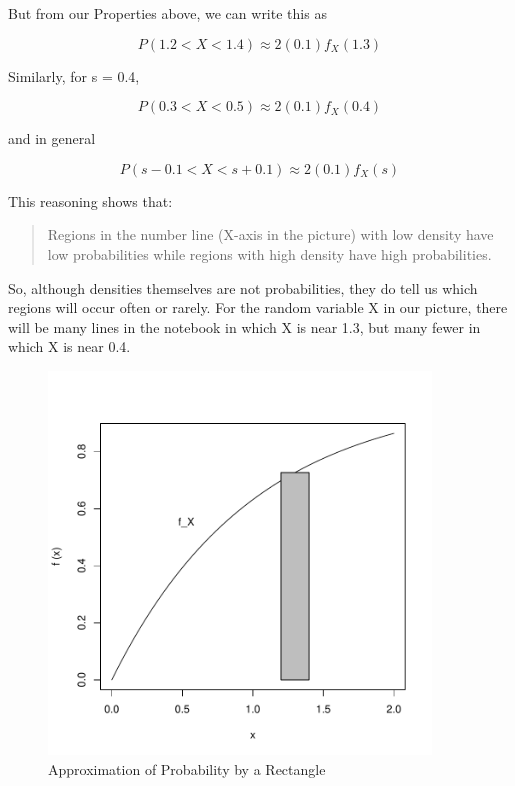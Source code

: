 But from our Properties above, we can write this as

\begin{equation}
\label{eq124}
P(1.2 < X < 1.4) \approx 2 (0.1) f_X(1.3) 
\end{equation}

Similarly, for s = 0.4,

\begin{equation}
\label{eq035}
P(0.3 < X < 0.5) \approx 2 (0.1) f_X(0.4) 
\end{equation}

and in general

\begin{equation}
\label{equuu}
P(s-0.1 < X < s+0.1) \approx 2 (0.1) f_X(s) 
\end{equation}

This reasoning shows that:

\begin{quote}
Regions in the number line (X-axis in the picture)
with low density have low probabilities while regions with high
density have high probabilities.  
\end{quote}

So, although densities themselves are not probabilities, they do tell us
which regions will occur often or rarely.  For the random variable X in
our picture, there will be many lines in the notebook in which X is near
1.3, but many fewer in which X is near 0.4.

\begin{figure}
\centerline{
\includegraphics[width=4in]{PlusMinusC.pdf}
}
\caption{Approximation of Probability by a Rectangle}
\label{pm}
\end{figure}

